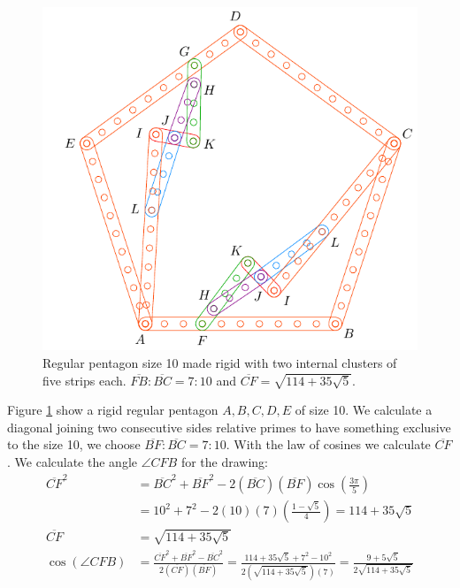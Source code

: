 \documentclass[11pt]{article}
\begin{document}
\begin{figure}[H]
 \centering
 \includegraphics[scale=0.9]{10/penta10a}
 \caption{Regular pentagon size 10 made rigid with two internal clusters of five strips each. $\overline{FB}:\overline{BC} = 7:10$ and $\overline{CF} = \sqrt{114 + 35\sqrt5}$.}
 \label{fig:penta10a}
\end{figure}

Figure \ref{fig:penta10a} show a rigid regular pentagon $A,B,C,D,E$ of size 10. We calculate a diagonal joining two consecutive sides relative primes to have something exclusive to the size 10, we choose $\overline{BF}:\overline{BC} = 7:10$. With the law of cosines we calculate $\overline{CF}$.
We calculate the angle $\angle{CFB}$ for the drawing:
\begin{align}
\overline{CF}^2 &= \overline{BC}^2 + \overline{BF}^2
 - 2(\overline{BC})(\overline{BF})\cos\left(\frac{3\pi}5\right) \nonumber\\
 &= 10^2 + 7^2 - 2(10)(7)\left(\frac{1-\sqrt5}4\right) = 114 + 35\sqrt5 \nonumber\\
\overline{CF} &= \sqrt{114 + 35\sqrt5} \\
\cos(\angle{CFB}) &= \frac{\overline{CF}^2 + \overline{BF}^2 - \overline{BC}^2}
 {2(\overline{CF})(\overline{BF})}%
 = \frac{114+35\sqrt5 + 7^2 - 10^2}{2(\sqrt{114 + 35\sqrt5})(7)}
  = \frac{9+5\sqrt5}{2\sqrt{114+35\sqrt5}}
\end{align}
\end{document}
